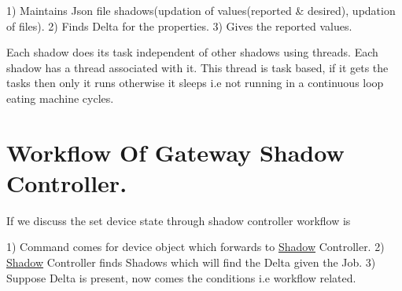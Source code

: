 1) Maintains Json file shadows(updation of values(reported \& desired), updation of files). 2) Finds Delta for the properties. 3) Gives the reported values.

Each shadow does its task independent of other shadows using threads. Each shadow has a thread associated with it. This thread is task based, if it gets the tasks then only it runs otherwise it sleeps i.\+e not running in a continuous loop eating machine cycles.\hypertarget{index_architecture_sec}{}\section{Workflow Of Gateway Shadow Controller.}\label{index_architecture_sec}
If we discuss the set device state through shadow controller workflow is

1) Command comes for device object which forwards to \hyperlink{classShadow}{Shadow} Controller. 2) \hyperlink{classShadow}{Shadow} Controller finds Shadows which will find the Delta given the Job. 3) Suppose Delta is present, now comes the conditions i.\+e workflow related. 